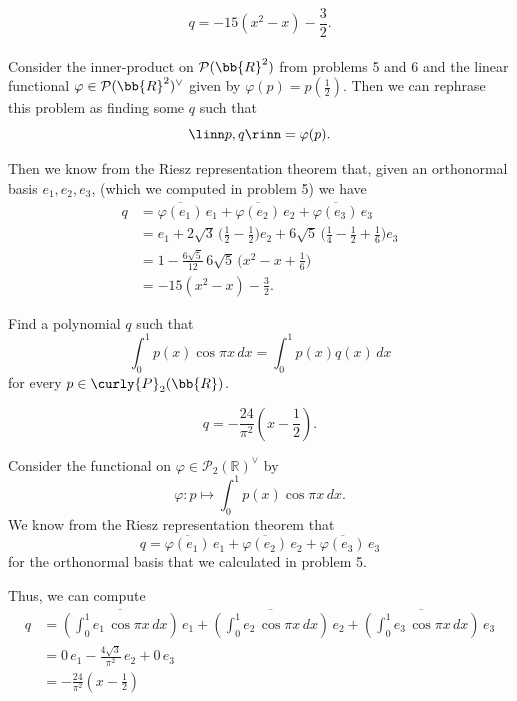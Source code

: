\documentclass[12pt, letterpaper]{hmcpset}
\begin{document}
\begin{solution}
	\[
		\boxed{
			q = -15 (x^2 - x) - \frac{3}{2}.
		}
	\] \\
	Consider the inner-product on $\mathcal{P}(\bb{R}^2)$ from problems 5 and 6 and the linear functional $\varphi \in \mathcal{P}(\bb{R}^2)^\vee$ given by $\varphi(p) = p(\frac{1}{2})$. Then we can rephrase this problem as finding some $q$ such that
	\[
		\linn p, q \rinn = \varphi(p).
	\]
	
	Then we know from the Riesz representation theorem that, given an orthonormal basis $e_1, e_2, e_3$, (which we computed in problem 5) we have
	\[
		\begin{split}
			q & = \overline{\varphi(e_1)} \, e_1 + \overline{\varphi(e_2)} \, e_2 + \overline{\varphi(e_3)} \, e_3 \\
			  & = e_1 + 2 \sqrt 3 \, \Big ( \frac{1}{2} - \frac{1}{2} \Big ) e_2 + 6 \sqrt 5 \, \Big ( \frac{1}{4} - \frac{1}{2} + \frac{1} {6}  \Big ) e_3 \\
			  & = 1 - \frac{6 \sqrt 5}{12} \, 6 \sqrt 5 \, \Big ( x^2 - x + \frac{1}{6} \Big ) \\
			  & = -15 (x^2 - x) - \frac{3}{2}.
		\end{split}
	\]
	
\end{solution}

\pagebreak

\begin{problem}[8]
	Find a polynomial $q$ such that
	\[
		\int_0^1 p(x) \cos{\pi x} \, dx = \int_0^1 p(x) q(x) \, dx
	\]
	for every $p \in \curly{P}_2(\bb{R})$.
\end{problem}

\begin{solution}
	\[
		\boxed{
			q = - \frac{24}{\pi^2} \left ( x - \frac{1}{2} \right ).
		}
	\]

	Consider the functional on $\varphi \in \mathcal P_2(\mathbb R)^\vee$ by
	\[
		\varphi : p \mapsto \int_0^1 p(x) \cos{\pi x} \, dx.
	\]
	We know from the Riesz representation theorem that
	\[
		q = \overline{\varphi(e_1)} \, e_1 + \overline{\varphi(e_2)} \, e_2 + \overline{\varphi(e_3)} \, e_3
	\]
	for the orthonormal basis that we calculated in problem 5.

	Thus, we can compute
	\[
		\begin{split}
			q & = \overline{ \left ( \int_0^1 e_1 \, \cos{\pi x} \, dx \right )} \, e_1 + \overline{\left ( \int_0^1 e_2 \, \cos{\pi x} \, dx \right )} \, e_2 + \overline{\left ( \int_0^1 e_3 \, \cos{\pi x} \, dx \right )} \, e_3 \\
			  & = 0 \, e_1 - \frac{4 \sqrt 3}{\pi^2} \, e_2 + 0 \, e_3 \\
			  & = - \frac{24}{\pi^2} \left ( x - \frac{1}{2} \right )
		\end{split}
	\]
\end{solution}
\end{document}
